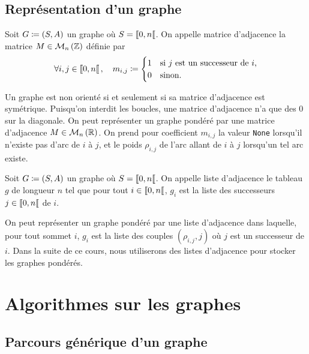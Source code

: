 \documentclass{magnolia}
\begin{document}
\subsection{Représentation d'un graphe}


\begin{definition}
Soit $G\coloneqq\left(S,A\right)$ un graphe où $S=\left\llbracket 0,n\right\llbracket$. On appelle matrice d'adjacence la matrice $M\in\mathcal{M}_{n}\left(\mathbb{Z}\right)$ définie par
\[\forall i,j\in\left\llbracket 0,n\right\llbracket ,\quad m_{i,j}\coloneqq\begin{cases}
  1 & \text{si $j$ est un successeur de  $i$,}\\
  0 & \text{sinon.}
\end{cases}\]
\end{definition}

\begin{remarques}
\remarque Un graphe est \og non orienté \fg si et seulement si sa matrice d'adjacence est symétrique.
\remarque Puisqu'on interdit les boucles, une matrice d'adjacence n'a
  que des 0 sur la diagonale.
\remarque On peut représenter un graphe pondéré par une matrice d'adjacence $M\in\mathcal{M}_{n}\left(\mathbb{R}\right)$. On prend
    pour coefficient $m_{i,j}$ la valeur \verb!None! lorsqu'il n'existe pas d'arc
    de $i$ à $j$, et le poids $\rho_{i,j}$ de l'arc allant de $i$ à $j$
    lorsqu'un tel arc existe. 
\end{remarques}

\begin{definition}
Soit $G\coloneqq\left(S,A\right)$ un graphe où $S=\left\llbracket 0,n\right\llbracket$. On appelle liste d'adjacence le tableau $g$ de longueur
$n$ tel que
pour tout $i\in\left\llbracket 0,n\right\llbracket$, $g_i$ est la liste des successeurs $j\in\left\llbracket 0,n\right\llbracket$
de $i$.
\end{definition}

\begin{remarqueUnique}
\remarque On peut représenter un graphe pondéré par une liste d'adjacence
    dans laquelle, pour tout sommet $i$, $g_i$ est la liste des couples
    $(\rho_{i,j},j)$ où $j$ est un successeur de $i$.
\remarque Dans la suite de ce
    cours, nous utiliserons des listes d'adjacence pour stocker les graphes pondérés.
\end{remarqueUnique}


\section{Algorithmes sur les graphes}

\subsection{Parcours générique d'un graphe}
\end{document}
